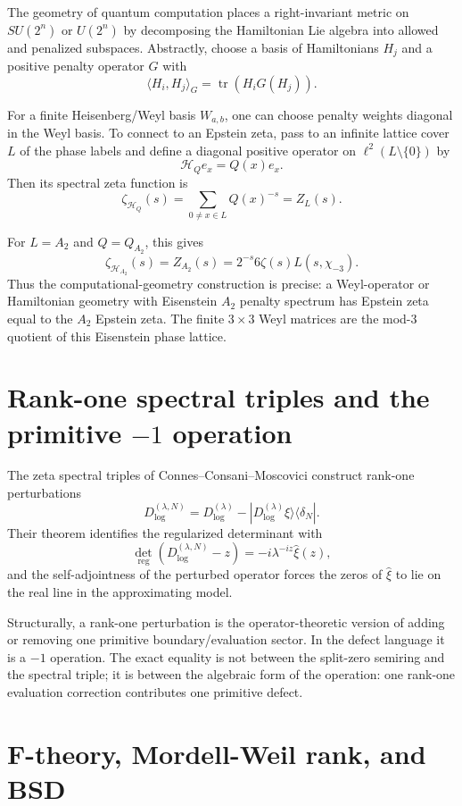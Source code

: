 \documentclass[11pt]{article}
\DeclareMathOperator{\tr}{tr}
\begin{document}
The geometry of quantum computation places a right-invariant metric on $SU(2^n)$ or $U(2^n)$ by decomposing the Hamiltonian Lie algebra into allowed and penalized subspaces.  Abstractly, choose a basis of Hamiltonians $H_j$ and a positive penalty operator $G$ with
\[
        \langle H_i,H_j\rangle_G=\tr(H_iG(H_j)).
\]

For a finite Heisenberg/Weyl basis $W_{a,b}$, one can choose penalty weights diagonal in the Weyl basis.  To connect to an Epstein zeta, pass to an infinite lattice cover $L$ of the phase labels and define a diagonal positive operator on $\ell^2(L\setminus\{0\})$ by
\[
        \mathcal H_Q e_x=Q(x)e_x.
\]
Then its spectral zeta function is
\[
        \zeta_{\mathcal H_Q}(s)=\sum_{0\ne x\in L}Q(x)^{-s}=Z_L(s).
\]

For $L=A_2$ and $Q=Q_{A_2}$, this gives
\[
        \zeta_{\mathcal H_{A_2}}(s)=Z_{A_2}(s)=2^{-s}6\zeta(s)L(s,\chi_{-3}).
\]
Thus the computational-geometry construction is precise: a Weyl-operator or Hamiltonian geometry with Eisenstein $A_2$ penalty spectrum has Epstein zeta equal to the $A_2$ Epstein zeta.  The finite $3\times3$ Weyl matrices are the mod-$3$ quotient of this Eisenstein phase lattice.

\section{Rank-one spectral triples and the primitive $-1$ operation}

The zeta spectral triples of Connes--Consani--Moscovici construct rank-one perturbations
\[
        D^{(\lambda,N)}_{\log}
        =D^{(\lambda)}_{\log}-|D^{(\lambda)}_{\log}\xi\rangle\langle\delta_N|.
\]
Their theorem identifies the regularized determinant with
\[
        \det_{\mathrm{reg}}(D^{(\lambda,N)}_{\log}-z)
        =-i\lambda^{-iz}\widehat\xi(z),
\]
and the self-adjointness of the perturbed operator forces the zeros of $\widehat\xi$ to lie on the real line in the approximating model.

Structurally, a rank-one perturbation is the operator-theoretic version of adding or removing one primitive boundary/evaluation sector.  In the defect language it is a $-1$ operation.  The exact equality is not between the split-zero semiring and the spectral triple; it is between the algebraic form of the operation: one rank-one evaluation correction contributes one primitive defect.

\section{F-theory, Mordell-Weil rank, and BSD}
\end{document}
